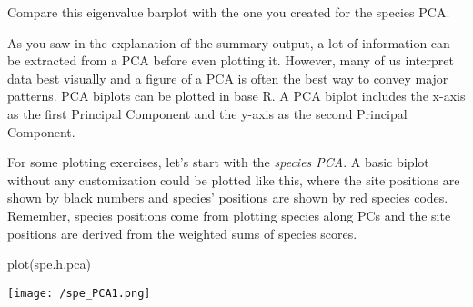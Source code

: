 \documentclass[
]{book}
\newenvironment{Shaded}{\begin{snugshade}}{\end{snugshade}}
\newcommand{\AttributeTok}[1]{\textcolor[rgb]{0.77,0.63,0.00}{#1}}
\newcommand{\CommentTok}[1]{\textcolor[rgb]{0.56,0.35,0.01}{\textit{#1}}}
\newcommand{\DecValTok}[1]{\textcolor[rgb]{0.00,0.00,0.81}{#1}}
\newcommand{\FunctionTok}[1]{\textcolor[rgb]{0.00,0.00,0.00}{#1}}
\newcommand{\NormalTok}[1]{#1}
\newcommand{\OtherTok}[1]{\textcolor[rgb]{0.56,0.35,0.01}{#1}}
\newcommand{\SpecialCharTok}[1]{\textcolor[rgb]{0.00,0.00,0.00}{#1}}
\newcommand{\StringTok}[1]{\textcolor[rgb]{0.31,0.60,0.02}{#1}}
\begin{document}
\begin{Shaded}
\end{Shaded}

Compare this eigenvalue barplot with the one you created for the species
PCA.

As you saw in the explanation of the summary output, a lot of
information can be extracted from a PCA before even plotting it.
However, many of us interpret data best visually and a figure of a PCA
is often the best way to convey major patterns. PCA biplots can be
plotted in base R. A PCA biplot includes the x-axis as the first
Principal Component and the y-axis as the second Principal Component.

For some plotting exercises, let's start with the \emph{species PCA}. A
basic biplot without any customization could be plotted like this, where
the site positions are shown by black numbers and species' positions are
shown by red species codes. Remember, species positions come from
plotting species along PCs and the site positions are derived from the
weighted sums of species scores.

\begin{Shaded}
\begin{Highlighting}[]
\FunctionTok{plot}\NormalTok{(spe.h.pca)}
\end{Highlighting}
\end{Shaded}

\texttt{[image: /spe\_PCA1.png]}
\end{document}
